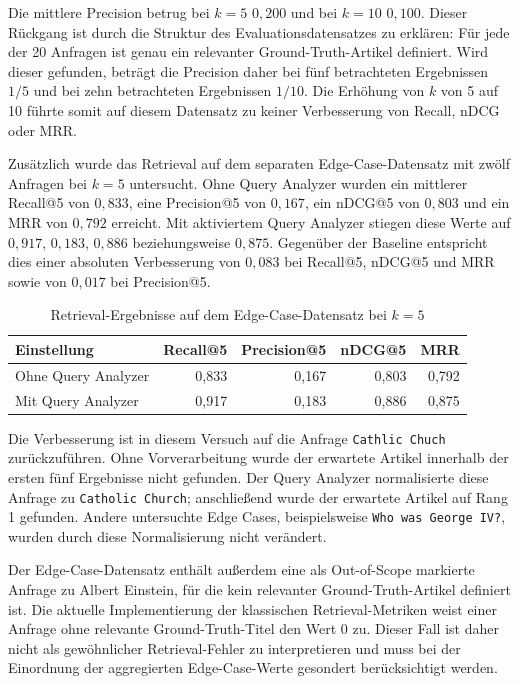 Die mittlere Precision betrug bei $k=5$ $0{,}200$ und bei $k=10$
$0{,}100$. Dieser Rückgang ist durch die Struktur des Evaluationsdatensatzes
zu erklären: Für jede der 20 Anfragen ist genau ein relevanter
Ground-Truth-Artikel definiert. Wird dieser gefunden, beträgt die
Precision daher bei fünf betrachteten Ergebnissen $1/5$ und bei zehn
betrachteten Ergebnissen $1/10$. Die Erhöhung von $k$ von 5 auf 10 führte
somit auf diesem Datensatz zu keiner Verbesserung von Recall, nDCG oder MRR.

Zusätzlich wurde das Retrieval auf dem separaten Edge-Case-Datensatz mit
zwölf Anfragen bei $k=5$ untersucht. Ohne Query Analyzer wurden ein
mittlerer Recall@5 von $0{,}833$, eine Precision@5 von $0{,}167$, ein
nDCG@5 von $0{,}803$ und ein MRR von $0{,}792$ erreicht. Mit aktiviertem Query Analyzer stiegen diese Werte auf $0{,}917$, $0{,}183$,
$0{,}886$ beziehungsweise $0{,}875$. Gegenüber der Baseline entspricht dies
einer absoluten Verbesserung von $0{,}083$ bei Recall@5, nDCG@5 und MRR sowie
von $0{,}017$ bei Precision@5.

\begin{table}[ht]
    \centering
    \caption{Retrieval-Ergebnisse auf dem Edge-Case-Datensatz bei $k=5$}
    \label{tab:retrieval-edge-cases}
    \begin{tabular}{lrrrr}
        \toprule
        Einstellung & Recall@5 & Precision@5 & nDCG@5 & MRR \\
        \midrule
        Ohne Query Analyzer & 0,833 & 0,167 & 0,803 & 0,792 \\
        Mit Query Analyzer  & 0,917 & 0,183 & 0,886 & 0,875 \\
        \bottomrule
    \end{tabular}
\end{table}

Die Verbesserung ist in diesem Versuch auf die Anfrage
\texttt{Cathlic Chuch} zurückzuführen. Ohne Vorverarbeitung wurde der
erwartete Artikel innerhalb der ersten fünf Ergebnisse nicht gefunden.
Der Query Analyzer normalisierte diese Anfrage zu
\texttt{Catholic Church}; anschließend wurde der erwartete Artikel auf
Rang 1 gefunden. Andere untersuchte Edge Cases, beispielsweise
\texttt{Who was George IV?}, wurden durch diese Normalisierung nicht
verändert.

Der Edge-Case-Datensatz enthält außerdem eine als Out-of-Scope markierte
Anfrage zu Albert Einstein, für die kein relevanter Ground-Truth-Artikel
definiert ist. Die aktuelle Implementierung der klassischen
Retrieval-Metriken weist einer Anfrage ohne relevante Ground-Truth-Titel
den Wert 0 zu. Dieser Fall ist daher nicht als gewöhnlicher
Retrieval-Fehler zu interpretieren und muss bei der Einordnung der
aggregierten Edge-Case-Werte gesondert berücksichtigt werden.

